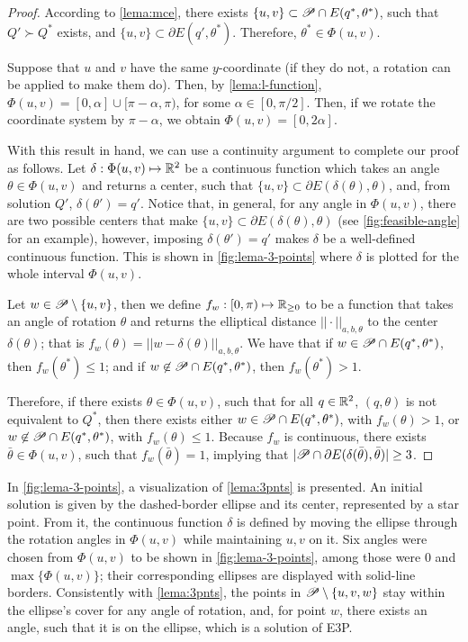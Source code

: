 \begin{proof}
	According to \autoref{lema:mce}, there exists $\{u, v\} \subset \mathscr{P} \cap E(q^*, \theta^*)$, such that $Q' \succ Q^*$ exists, and $\{u, v\} \subset \partial E(q', \theta^*)$. Therefore, $\theta^*\in\Phi(u,v)$.
	
	Suppose that $u$ and $v$ have the same $y$-coordinate (if they do not, a rotation can be applied to make them do). Then, by \autoref{lema:l-function}, $\Phi(u,v)=[0, \alpha] \cup [\pi-\alpha, \pi)$, for some $\alpha \in [0, \pi/2]$. Then, if we rotate the coordinate system by $\pi-\alpha$, we obtain $\Phi(u,v)=[0, 2\alpha]$.
	
	With this result in hand, we can use a continuity argument to complete our proof as follows.
	Let $\delta : \Phi(u,v) \mapsto \mathbb{R}^2$ be a continuous function which takes an angle $\theta\in\Phi(u,v)$ and returns a center, such that $\{u,v\} \subset \partial E(\delta(\theta), \theta)$, and, from solution $Q'$, $\delta(\theta') = q'$. Notice that, in general, for any angle in $\Phi(u,v)$, there are two possible centers that make $\{u,v\} \subset \partial E(\delta(\theta), \theta)$ (see \autoref{fig:feasible-angle} for an example), however, imposing $\delta(\theta') = q'$ makes $\delta$ be a well-defined continuous function. This is shown in \autoref{fig:lema-3-points} where $\delta$ is plotted for the whole interval $\Phi(u,v)$.
	
	Let $w\in \mathscr{P} \setminus \{u,v\}$, then we define $f_w  : [0, \pi) \mapsto \mathbb{R}_{\ge0}$ to be a function that takes an angle of rotation $\theta$ and returns the elliptical distance $||\cdot||_{a,b,\theta}$ to the center $\delta(\theta)$; that is $f_w(\theta)=||w-\delta(\theta)||_{a,b,\theta}$.
	We have that if $w \in \mathscr{P} \cap E(q^*, \theta^*)$, then $f_w(\theta^*) \le 1$; and if $w \not\in \mathscr{P} \cap E(q^*, \theta^*)$, then $f_w(\theta^*) > 1$.
	
	Therefore, if there exists $\theta\in\Phi(u,v)$, such that for all $q\in\mathbb{R}^2$, $(q, \theta)$ is not equivalent to $Q^*$, then there exists either $w \in \mathscr{P} \cap E(q^*, \theta^*)$, with $f_w(\theta)>1$, or $w \not\in \mathscr{P} \cap E(q^*, \theta^*)$, with $f_w(\theta)\le 1$. Because $f_w$ is continuous, there exists $\bar{\theta}\in\Phi(u,v)$, such that $f_w(\bar{\theta})=1$, implying that $|\mathscr{P} \cap \partial E(\delta(\bar{\theta}), \bar{\theta})| \ge 3$.
\end{proof}

In \autoref{fig:lema-3-points}, a visualization of \autoref{lema:3pnts} is presented.
An initial solution is given by the dashed-border ellipse and its center, represented by a star point. From it, the continuous function $\delta$ is defined by moving the ellipse through the rotation angles in $\Phi(u,v)$ while maintaining $u, v$ on it. Six angles were chosen from $\Phi(u,v)$ to be shown in \autoref{fig:lema-3-points}, among those were $0$ and $\max\{\Phi(u,v)\}$; their corresponding ellipses are displayed with solid-line borders.
Consistently with \autoref{lema:3pnts}, the points in $\mathscr{P} \setminus \{u, v, w\}$ stay within the ellipse's cover for any angle of rotation, and, for point $w$, there exists an angle, such that it is on the ellipse, which is a solution of E3P.

